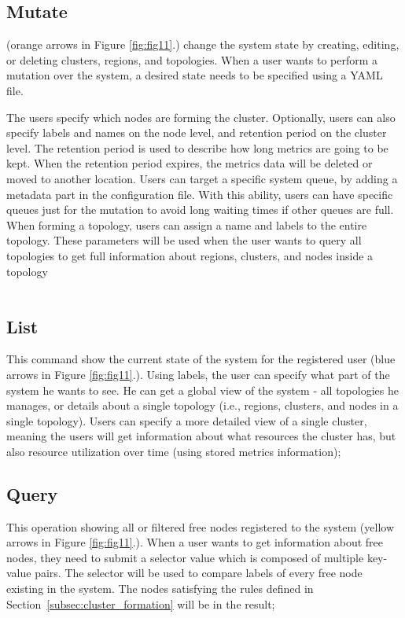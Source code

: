 \subsection{Mutate}\label{sec:mutate} 
(orange arrows in Figure \ref{fig:fig11}.) change the system state by creating, editing, or deleting clusters, regions, and topologies. When a user wants to perform a mutation over the system, a desired state needs to be specified using a YAML file. 

The users specify which nodes are forming the cluster. Optionally, users can also specify labels and names on the node level, and retention period on the cluster level. The retention period is used to describe how long metrics are going to be kept. When the retention period expires, the metrics data will be deleted or moved to another location. Users can target a specific system queue, by adding a metadata part in the configuration file. With this ability, users can have specific queues just for the mutation to avoid long waiting times if other queues are full. When forming a topology, users can assign a name and labels to the entire topology. These parameters will be used when the user wants to query all topologies to get full information about regions, clusters, and nodes inside a topology

\begin{center}
	\begin{tabular}{c}
		
	\end{tabular}
\end{center}
%
%
\subsection{List}\label{sec:list}  
This command show the current state of the system for the registered user (blue arrows in Figure \ref{fig:fig11}.). Using labels, the user can specify what part of the system he wants to see. He can get a global view of the system - all topologies he manages, or details about a single topology (i.e., regions, clusters, and nodes in a single topology). Users can specify a more detailed view of a single cluster, meaning the users will get information about what resources the cluster has, but also resource utilization over time (using stored metrics information); 
%
%
\subsection{Query}\label{sec:query} 
% 
This operation showing all or filtered free nodes registered to the system (yellow arrows in Figure \ref{fig:fig11}.). When a user wants to get information about free nodes, they need to submit a selector value which is composed of multiple key-value pairs. The selector will be used to compare labels of every free node existing in the system. The nodes satisfying the rules defined in Section~\ref{subsec:cluster_formation} will be in the result; 
%
%
